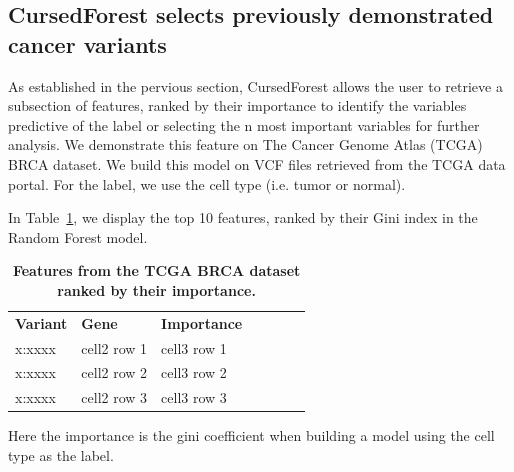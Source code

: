 \documentclass[10pt,a4paper]{article}  %
\newlength\savedwidth
\newcommand\thickhline{\noalign{\global\savedwidth\arrayrulewidth\global\arrayrulewidth 2pt}%
\hline
\noalign{\global\arrayrulewidth\savedwidth}}
\begin{document}
\begin{figure}[tbhp]
\begin{tabular}{ll}
\end{tabular}
\label{figure:synth}
\end{figure}


\subsection{CursedForest selects previously demonstrated cancer variants }
As established in the pervious section, CursedForest allows the user to retrieve a subsection of features, ranked by their importance to identify the variables predictive of the label or selecting the n most important variables for further analysis. 
We demonstrate this feature on The Cancer Genome Atlas (TCGA) BRCA dataset. 
We build this model on VCF files retrieved from the TCGA data portal. 
For the label, we use the cell type (i.e. tumor or normal). 

In Table~\ref{table3}, we display the top 10 features, ranked by their Gini index in the Random Forest model.

\begin{table}[!ht]
\centering
\caption{
{\bf Features from the TCGA BRCA dataset ranked by their importance.}}
\begin{tabular}{|l|l|l|l|l|l|l|}
\hline
{\bf Variant} & {\bf Gene} & {\bf Importance}\\ \thickhline
x:xxxx & cell2 row 1 & cell3 row 1\\ \hline
x:xxxx & cell2 row 2 & cell3 row 2\\ \hline
x:xxxx & cell2 row 3 & cell3 row 3\\ \hline
\end{tabular}
\begin{flushleft} Here the importance is the gini coefficient when building a model using the cell type as the label.
\end{flushleft}
\label{table3}
\end{table}
\end{document}
